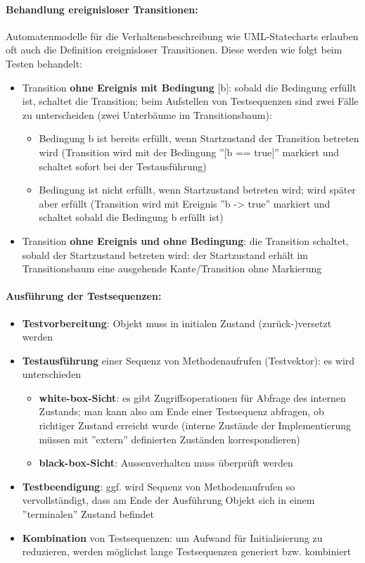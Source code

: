 \paragraph{Behandlung ereignisloser Transitionen:}

Automatenmodelle für die Verhaltensbeschreibung wie UML-Statecharts erlauben oft auch die Definition ereignisloser Transitionen. Diese werden wie folgt beim Testen behandelt:


\begin{itemize}
	\item Transition \textbf{ohne Ereignis mit Bedingung} [b]: sobald die Bedingung erfüllt ist, schaltet die Transition; beim Aufstellen von Testsequenzen sind zwei Fälle zu unterscheiden (zwei Unterbäume im Transitionsbaum):
	\begin{itemize}
		\item Bedingung b ist bereits erfüllt, wenn Startzustand der Transition betreten wird (Transition wird mit der Bedingung ''[b == true]'' markiert und schaltet sofort bei der Testausführung)
		\item Bedingung ist nicht erfüllt, wenn Startzustand betreten wird; wird später aber erfüllt (Transition wird mit Ereignis ''b -> true'' markiert und schaltet sobald die Bedingung b erfüllt ist)
	\end{itemize}
	\item Transition \textbf{ohne Ereignis und ohne Bedingung}: die Transition schaltet, sobald der Startzustand betreten wird: der Startzustand erhält im Transitionsbaum eine ausgehende Kante/Transition ohne Markierung
\end{itemize}

\paragraph{Ausführung der Testsequenzen:}
\begin{itemize}
	\item \textbf{Testvorbereitung}: Objekt muss in initialen Zustand (zurück-)versetzt werden
	\item \textbf{Testausführung} einer Sequenz von Methodenaufrufen (Testvektor): es wird unterschieden 
	\begin{itemize}
		\item \textbf{white-box-Sicht}: es gibt Zugriffsoperationen für Abfrage des internen Zustands; man kann also am Ende einer Testsequenz abfragen, ob richtiger Zustand erreicht wurde (interne Zustände der Implementierung müssen mit ''extern'' definierten Zuständen korrespondieren)
		\item \textbf{black-box-Sicht}: Aussenverhalten muss überprüft werden
	\end{itemize}
	\item \textbf{Testbeendigung}: ggf. wird Sequenz von Methodenaufrufen so vervollständigt, dass am Ende der Ausführung Objekt sich in einem ''terminalen'' Zustand befindet
	\item \textbf{Kombination} von Testsequenzen: um Aufwand für Initialisierung zu reduzieren, werden möglichst lange Testsequenzen generiert bzw. kombiniert
\end{itemize}

